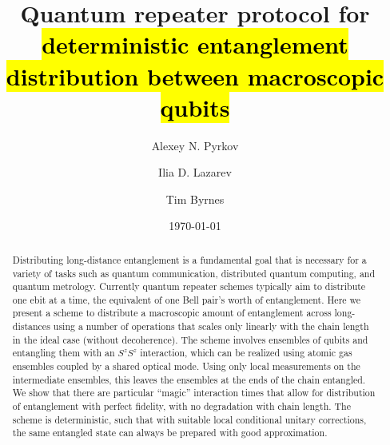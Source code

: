 \documentclass[%
  prx,%
  twocolumn,%
  preprintnumbers,%
  amsmath,%
  amssymb,%
  superscriptaddress%
]{revtex4}
\begin{document}

\title{Quantum repeater protocol for \hl{deterministic entanglement distribution between macroscopic qubits}}

\author{Alexey N. Pyrkov}


\author{Ilia D. Lazarev}

\author{Tim Byrnes}


\date{\today}%


\begin{abstract}
Distributing long-distance entanglement is a fundamental goal that is necessary for a variety of tasks such as quantum communication, distributed quantum computing, and quantum metrology.  Currently quantum repeater schemes typically  aim to distribute one ebit at a time, the equivalent of one Bell pair's worth of entanglement.  Here we present a scheme to distribute a macroscopic amount of entanglement across long-distances using a number of operations that scales only linearly with the chain length in the ideal case (without decoherence).  The scheme involves ensembles of qubits and entangling them with an $S^z S^z$ interaction, which can be realized using atomic gas ensembles coupled by a shared optical mode. Using only local measurements on the intermediate ensembles, this leaves the ensembles at the ends of the chain entangled.  We show that there are particular ``magic'' interaction times that allow for distribution of entanglement with perfect fidelity, with no degradation with chain length.  The scheme is deterministic, such that with suitable local conditional unitary corrections, the same entangled state can always be prepared with good approximation.

\end{abstract}
\end{document}
